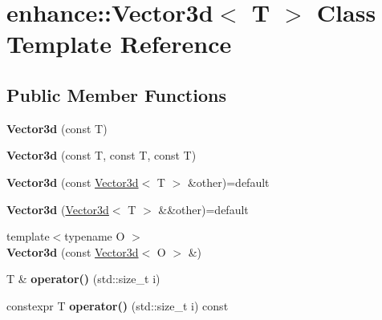 \hypertarget{classenhance_1_1Vector3d}{}\section{enhance\+:\+:Vector3d$<$ T $>$ Class Template Reference}
\label{classenhance_1_1Vector3d}
\subsection*{Public Member Functions}
\begin{DoxyCompactItemize}
\item 
\mbox{\label{classenhance_1_1Vector3d_a3543948b081e615391d5187771009fb3}} 
{\bfseries Vector3d} (const T)
\item 
\mbox{\label{classenhance_1_1Vector3d_aeb44c9b3730a5b683a4a5fbabb72c71c}} 
{\bfseries Vector3d} (const T, const T, const T)
\item 
\mbox{\label{classenhance_1_1Vector3d_abaf33fc8fba175c1bbf87b1f2e5e2564}} 
{\bfseries Vector3d} (const \mbox{\hyperlink{classenhance_1_1Vector3d}{Vector3d}}$<$ T $>$ \&other)=default
\item 
\mbox{\label{classenhance_1_1Vector3d_a9a1412d434ddb2a93c1213f85988c5fe}} 
{\bfseries Vector3d} (\mbox{\hyperlink{classenhance_1_1Vector3d}{Vector3d}}$<$ T $>$ \&\&other)=default
\item 
\mbox{\label{classenhance_1_1Vector3d_a7f9f64359509dbb370a5d2674a771f26}} 
{\footnotesize template$<$typename O $>$ }\\{\bfseries Vector3d} (const \mbox{\hyperlink{classenhance_1_1Vector3d}{Vector3d}}$<$ O $>$ \&)
\item 
\mbox{\label{classenhance_1_1Vector3d_a13390fa422869e4048d2a49209273fe2}} 
T \& {\bfseries operator()} (std\+::size\+\_\+t i)
\item 
\mbox{\label{classenhance_1_1Vector3d_aa201770b97b019d5c1abf69e5b1a1c49}} 
constexpr T {\bfseries operator()} (std\+::size\+\_\+t i) const
\item 

\end{DoxyCompactItemize}
